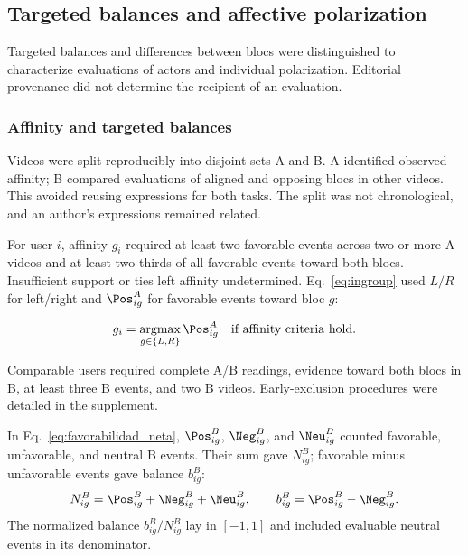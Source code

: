 \documentclass[conference, letterpaper]{IEEEtran}
\begin{document}
\subsection{Targeted balances and affective polarization}

Targeted balances and differences between blocs were distinguished to characterize evaluations of actors and individual polarization. Editorial provenance did not determine the recipient of an evaluation.

\subsubsection{Affinity and targeted balances}

Videos were split reproducibly into disjoint sets A and B. A identified observed affinity; B compared evaluations of aligned and opposing blocs in other videos. This avoided reusing expressions for both tasks. The split was not chronological, and an author's expressions remained related.

For user $i$, affinity $g_i$ required at least two favorable events across two or more A videos and at least two thirds of all favorable events toward both blocs. Insufficient support or ties left affinity undetermined. Eq.~\eqref{eq:ingroup} used $L/R$ for left/right and $\Pos^A_{ig}$ for favorable events toward bloc $g$:

\begin{equation}
g_i=\operatorname*{argmax}_{g\in\{L,R\}}\Pos^A_{ig}
\quad\text{if affinity criteria hold.}
\label{eq:ingroup}
\end{equation}

Comparable users required complete A/B readings, evidence toward both blocs in B, at least three B events, and two B videos. Early-exclusion procedures were detailed in the supplement.

In Eq.~\eqref{eq:favorabilidad_neta}, $\Pos^B_{ig}$, $\Neg^B_{ig}$, and $\Neu^B_{ig}$ counted favorable, unfavorable, and neutral B events. Their sum gave $N^B_{ig}$; favorable minus unfavorable events gave balance $b^B_{ig}$:
\begin{equation}
N^B_{ig}=\Pos^B_{ig}+\Neg^B_{ig}+\Neu^B_{ig},\qquad b^B_{ig}=\Pos^B_{ig}-\Neg^B_{ig}.
\label{eq:favorabilidad_neta}
\end{equation}
The normalized balance $b^B_{ig}/N^B_{ig}$ lay in $[-1,1]$ and included evaluable neutral events in its denominator.
\end{document}

